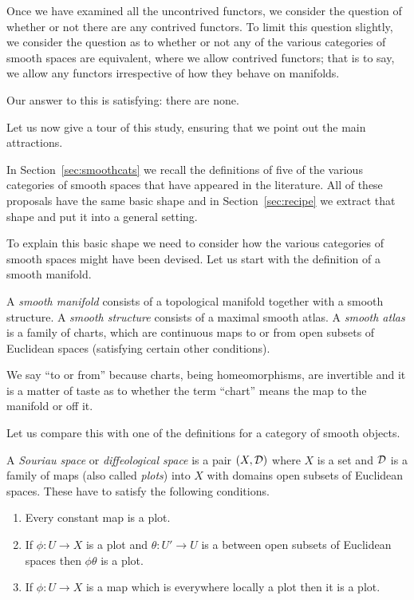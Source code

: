 \documentclass[%
12pt,%
arxiv,%
defaults
]{myclass}
\begin{document}
Once we have examined all the uncontrived functors, we consider the question of whether or not there are any contrived functors.
To limit this question slightly, we consider the question as to whether or not any of the various categories of smooth spaces are equivalent, where we allow contrived functors; that is to say, we allow any functors irrespective of how they behave on manifolds.

Our answer to this is satisfying: there are none.

\medskip

Let us now give a tour of this study, ensuring that we point out the main attractions.

In Section~\ref{sec:smoothcats} we recall the definitions of five of the various categories of smooth spaces that have appeared in the literature.
All of these proposals have the same basic shape and in Section~\ref{sec:recipe} we extract that shape and put it into a general setting.

To explain this basic shape we need to consider how the various categories of smooth spaces might have been devised.
Let us start with the definition of a smooth manifold.

\begin{defn}
A \emph{smooth manifold} consists of a topological manifold together with a smooth structure.
A \emph{smooth structure} consists of a maximal smooth atlas.
A \emph{smooth atlas} is a family of charts, which are continuous maps to or from open subsets of Euclidean spaces (satisfying certain other conditions).
\end{defn}

We say ``to or from'' because charts, being homeomorphisms, are invertible and it is a matter of taste as to whether the term ``chart'' means the map to the manifold or off it.

Let us compare this with one of the definitions for a category of smooth objects.

\begin{defn}
 A \emph{Souriau space} or \emph{diffeological space} is a pair \((X, \mathcal{D})\) where \(X\) is a set and \(\mathcal{D}\) is a family of maps (also called \emph{plots}) into \(X\) with domains open subsets of Euclidean spaces.
 These have to satisfy the following conditions.
 \begin{enumerate}
 \item
  Every constant map is a plot.
 \item
  If \(\phi \colon U \to X\) is a plot and
   \(\theta \colon U' \to U\)
  is a \cimap between open subsets of Euclidean spaces then \(\phi\theta\) is a plot.
 \item
  If \(\phi \colon U \to X\) is a map which is everywhere locally a plot then it is a plot.
 \end{enumerate}
\end{defn}
\end{document}
